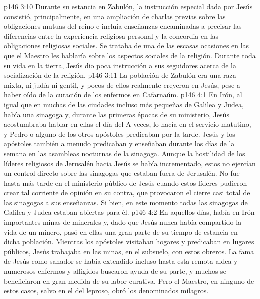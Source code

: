 \vs p146 3:10 \pc Durante su estancia en Zabulón, la instrucción especial dada por Jesús consistió, principalmente, en una ampliación de charlas previas sobre las obligaciones mutuas del reino e incluía enseñanzas encaminadas a precisar las diferencias entre la experiencia religiosa personal y la concordia en las obligaciones religiosas sociales. Se trataba de una de las escasas ocasiones en las que el Maestro les hablaría sobre los aspectos sociales de la religión. Durante toda su vida en la tierra, Jesús dio poca instrucción a sus seguidores acerca de la socialización de la religión.
\vs p146 3:11 La población de Zabulón era una raza mixta, ni judía ni gentil, y pocos de ellos realmente creyeron en Jesús, pese a haber oído de la curación de los enfermos en Cafarnaúm.
\vs p146 4:1 En Irón, al igual que en muchas de las ciudades incluso más pequeñas de Galilea y Judea, había una sinagoga y, durante las primeras épocas de su ministerio, Jesús acostumbraba hablar en ellas el día del  A veces, lo hacía en el servicio matutino, y Pedro o alguno de los otros apóstoles predicaban por la tarde. Jesús y los apóstoles también a menudo predicaban y enseñaban durante los días de la semana en las asambleas nocturnas de la sinagoga. Aunque la hostilidad de los líderes religiosos de Jerusalén hacia Jesús se había incrementado, estos no ejercían un control directo sobre las sinagogas que estaban fuera de Jerusalén. No fue hasta más tarde en el ministerio público de Jesús cuando estos líderes pudieron crear tal corriente de opinión en su contra, que provocaron el cierre casi total de las sinagogas a sus enseñanzas. Si bien, en este momento todas las sinagogas de Galilea y Judea estaban abiertas para él.
\vs p146 4:2 En aquellos días, había en Irón importantes minas de minerales y, dado que Jesús nunca había compartido la vida de un minero, pasó en ellas una gran parte de su tiempo de estancia en dicha población. Mientras los apóstoles visitaban hogares y predicaban en lugares públicos, Jesús trabajaba en las minas, en el subsuelo, con estos obreros. La fama de Jesús como sanador se había extendido incluso hasta esta remota aldea y numerosos enfermos y afligidos buscaron ayuda de su parte, y muchos se beneficiaron en gran medida de su labor curativa. Pero el Maestro, en ninguno de estos casos, salvo en el del leproso, obró los denominados milagros.
